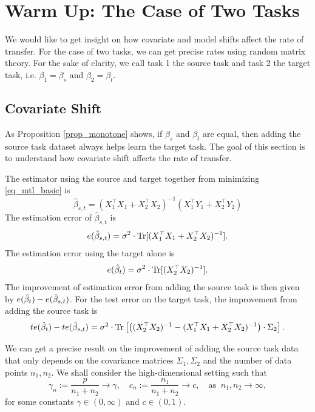 \section{Warm Up: The Case of Two Tasks}\label{sec_defspike}


We would like to get insight on how covariate and model shifts affect the rate of transfer.
For the case of two tasks, we can get precise rates using random matrix theory.
For the sake of clarity, we call task 1 the source task and task 2 the target task,
i.e. $\beta_1 = \beta_s$ and $\beta_2 = \beta_t$.

\subsection{Covariate Shift}

As Proposition \ref{prop_monotone} shows, if $\beta_s$ and $\beta_t$ are equal, then adding the source task dataset always helps learn the target task.
The goal of this section is to understand how covariate shift affects the rate of transfer. 

The estimator using the source and target together from minimizing \eqref{eq_mtl_basic} is
\[ \hat{\beta}_{s,t} = (X_1^{\top} X_1 + X_2^{\top} X_2)^{-1} (X_1^{\top}Y_1 + X_2^{\top}Y_2)\]
The estimation error of $\hat{\beta}_{s,t}$ is
\begin{align}\label{eq_two_task}
  e(\hat{\beta}_{s,t}) = \sigma^2 \cdot \operatorname{Tr}[(X_1^{\top}X_1 + X_2^{\top} X_2)^{-1}].
\end{align}
The estimation error using the target alone is
\begin{align}\label{eq_target_task}
	e(\hat{\beta}_t) = \sigma^2 \cdot \operatorname{Tr}[(X_2^{\top} X_2)^{-1}].
\end{align}
The improvement of estimation error from adding the source task is then given by
$e(\hat{\beta}_t) - e(\hat{\beta}_{s,t})$.
For the test error on the target task, the improvement from adding the source task is
\[ te(\hat{\beta}_t) - te(\hat{\beta}_{s,t}) = \sigma^2\cdot\operatorname{Tr}\left[\left({(X_2^{\top}X_2)^{-1} - (X_1^{\top}X_1 + X_2^{\top}X_2)^{-1}}\right)\cdot\Sigma_2\right]. \]

We can get a precise result on the improvement of adding the source task data that only depends on the covariance matrices $\Sigma_1, \Sigma_2$ and the number of data points $n_1, n_2$.
We shall consider the high-dimensional setting such that
$$\gamma_n:= \frac{p} {n_1 + n_2} \to \gamma,\quad c_n:= \frac{n_1}{n_1 + n_2} \to c, \quad \text{as } \ n_1, n_2\to \infty, $$
for some constants $\gamma\in (0,\infty)$ and $c \in (0,1)$.


